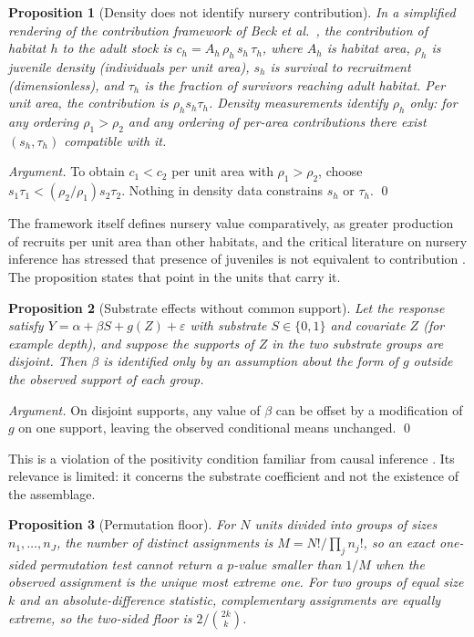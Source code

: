 \documentclass[11pt]{article}
\newtheorem{proposition}{Proposition}
\theoremstyle{definition}
\theoremstyle{remark}
\begin{document}
\begin{proposition}[Density does not identify nursery contribution]\label{prop:nursery}
In a simplified rendering of the contribution framework of Beck et al.\ \cite{beck2001}, the contribution of habitat $h$ to the adult stock is $c_h=A_h\,\rho_h\,s_h\,\tau_h$, where $A_h$ is habitat area, $\rho_h$ is juvenile density (individuals per unit area), $s_h$ is survival to recruitment (dimensionless), and $\tau_h$ is the fraction of survivors reaching adult habitat. Per unit area, the contribution is $\rho_hs_h\tau_h$. Density measurements identify $\rho_h$ only: for any ordering $\rho_1>\rho_2$ and any ordering of per-area contributions there exist $(s_h,\tau_h)$ compatible with it.
\end{proposition}

\emph{Argument.} To obtain $c_1<c_2$ per unit area with $\rho_1>\rho_2$, choose $s_1\tau_1<(\rho_2/\rho_1)s_2\tau_2$. Nothing in density data constrains $s_h$ or $\tau_h$. \qed

The framework itself defines nursery value comparatively, as greater production of recruits per unit area than other habitats, and the critical literature on nursery inference has stressed that presence of juveniles is not equivalent to contribution \cite{sheaves2006,dahlgren2006}. The proposition states that point in the units that carry it.

\begin{proposition}[Substrate effects without common support]\label{prop:support}
Let the response satisfy $Y=\alpha+\beta S+g(Z)+\varepsilon$ with substrate $S\in\{0,1\}$ and covariate $Z$ (for example depth), and suppose the supports of $Z$ in the two substrate groups are disjoint. Then $\beta$ is identified only by an assumption about the form of $g$ outside the observed support of each group.
\end{proposition}

\emph{Argument.} On disjoint supports, any value of $\beta$ can be offset by a modification of $g$ on one support, leaving the observed conditional means unchanged. \qed

This is a violation of the positivity condition familiar from causal inference \cite{petersen2012}. Its relevance is limited: it concerns the substrate coefficient and not the existence of the assemblage.

\begin{proposition}[Permutation floor]\label{prop:perm}
For $N$ units divided into groups of sizes $n_1,\dots,n_J$, the number of distinct assignments is $M=N!/\prod_jn_j!$, so an exact one-sided permutation test cannot return a $p$-value smaller than $1/M$ when the observed assignment is the unique most extreme one. For two groups of equal size $k$ and an absolute-difference statistic, complementary assignments are equally extreme, so the two-sided floor is $2/\binom{2k}{k}$.
\end{proposition}
\end{document}
